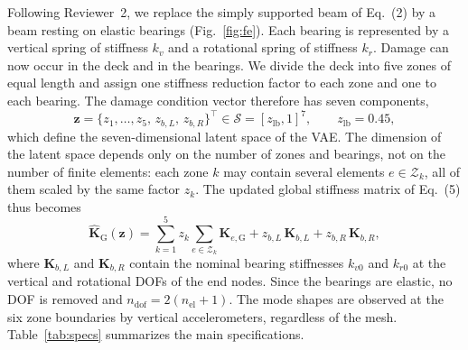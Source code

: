 \documentclass[11pt]{article}
\newcommand{\z}{\mathbf{z}}
\newcommand{\Kh}{\hat{\mathbf{K}}_{\mathrm{G}}}
\begin{document}
Following Reviewer~2, we replace the simply supported beam of Eq.~(2) by a beam resting on elastic bearings
(Fig.~\ref{fig:fe}). Each bearing is represented by a vertical spring of stiffness $k_v$ and a rotational spring of
stiffness $k_r$. Damage can now occur in the deck and in the bearings. We divide the deck into five zones of equal
length and assign one stiffness reduction factor to each zone and one to each bearing. The damage condition vector
therefore has seven components,
\begin{equation}
\z = \{z_1,\dots,z_5,\,z_{b,L},\,z_{b,R}\}^\top\in\mathcal{S}=[z_{\mathrm{lb}},1]^{7},\qquad z_{\mathrm{lb}}=0.45 ,
\end{equation}
which define the seven-dimensional latent space of the VAE. The dimension of the latent space depends only on the
number of zones and bearings, not on the number of finite elements: each zone $k$ may contain several elements
$e\in\mathcal{Z}_k$, all of them scaled by the same factor $z_k$. The updated global stiffness matrix of Eq.~(5) thus
becomes
\begin{equation}
\Kh(\z) = \sum_{k=1}^{5} z_k \sum_{e\in\mathcal{Z}_k}\mathbf{K}_{e,\mathrm{G}}
        + z_{b,L}\,\mathbf{K}_{b,L} + z_{b,R}\,\mathbf{K}_{b,R},
\label{eq:Kz}
\end{equation}
where $\mathbf{K}_{b,L}$ and $\mathbf{K}_{b,R}$ contain the nominal bearing stiffnesses $k_{v0}$ and $k_{r0}$ at the
vertical and rotational DOFs of the end nodes. Since the bearings are elastic, no DOF is removed and
$n_{\mathrm{dof}}=2(n_{\mathrm{el}}+1)$. The mode shapes are observed at the six zone boundaries by vertical
accelerometers, regardless of the mesh. Table~\ref{tab:specs} summarizes the main specifications.
\end{document}
